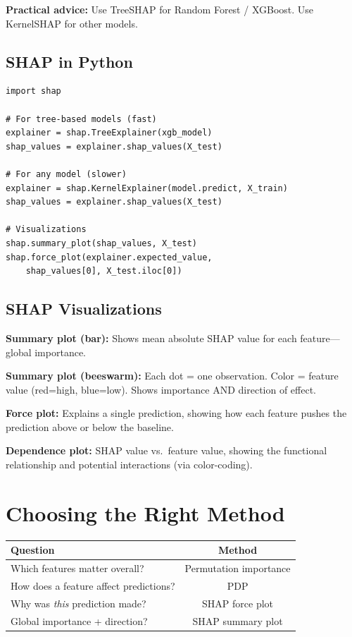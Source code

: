 \documentclass[11pt,a4paper]{article}
\begin{document}
\textbf{Practical advice:} Use TreeSHAP for Random Forest / XGBoost. Use KernelSHAP for other models.

\subsection{SHAP in Python}

\begin{verbatim}
import shap

# For tree-based models (fast)
explainer = shap.TreeExplainer(xgb_model)
shap_values = explainer.shap_values(X_test)

# For any model (slower)
explainer = shap.KernelExplainer(model.predict, X_train)
shap_values = explainer.shap_values(X_test)

# Visualizations
shap.summary_plot(shap_values, X_test)
shap.force_plot(explainer.expected_value, 
    shap_values[0], X_test.iloc[0])
\end{verbatim}

\subsection{SHAP Visualizations}

\textbf{Summary plot (bar):} Shows mean absolute SHAP value for each feature---global importance.

\textbf{Summary plot (beeswarm):} Each dot = one observation. Color = feature value (red=high, blue=low). Shows importance AND direction of effect.

\textbf{Force plot:} Explains a single prediction, showing how each feature pushes the prediction above or below the baseline.

\textbf{Dependence plot:} SHAP value vs.\ feature value, showing the functional relationship and potential interactions (via color-coding).

\section{Choosing the Right Method}

\begin{center}
\begin{tabular}{lc}
    \toprule
    \textbf{Question} & \textbf{Method} \\
    \midrule
    Which features matter overall? & Permutation importance \\
    How does a feature affect predictions? & PDP \\
    Why was \emph{this} prediction made? & SHAP force plot \\
    Global importance + direction? & SHAP summary plot \\
    \bottomrule
\end{tabular}
\end{center}
\end{document}
